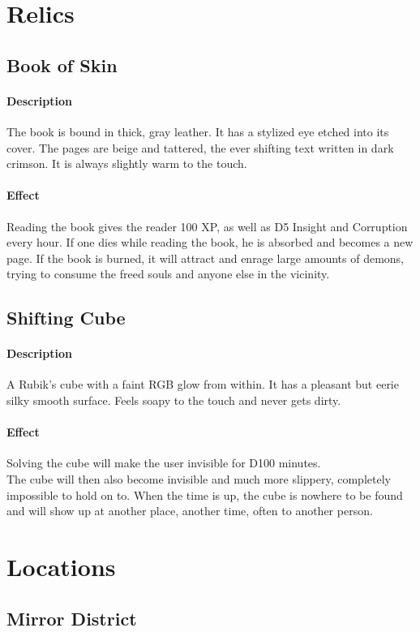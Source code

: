 \section{Relics}
\subsection*{Book of Skin}
\paragraph{Description}
The book is bound in thick, gray leather.
It has a stylized eye etched into its cover.
The pages are beige and tattered,
	the ever shifting text written in dark crimson.
It is always slightly warm to the touch.
\paragraph{Effect}
Reading the book gives the reader
	100 XP, as well as D5 Insight and Corruption every hour.
If one dies while reading the book, he is absorbed and becomes a new page.
If the book is burned, it will attract and enrage large amounts of demons,
	trying to consume the freed souls and anyone else in the vicinity.
\subsection*{Shifting Cube}
\paragraph{Description}
A Rubik's cube with a faint RGB glow from within.
It has a pleasant but eerie silky smooth surface.
Feels soapy to the touch and never gets dirty.
\paragraph{Effect}
Solving the cube will make the user invisible for D100 minutes.
\\%
The cube will then also become invisible and much more slippery,
	completely impossible to hold on to.
When the time is up,
	the cube is nowhere to be found
	and will show up at another place, another time, often to another person.

\section{Locations}
\subsection*{Mirror District}

